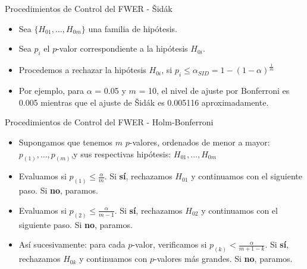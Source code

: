 \begin{frame}{Procedimientos de Control del FWER - Šidák}
\begin{itemize}[<+- | alert@+>]
    \item Sea $\{H_{01},\dots,H_{0m}\}$ una familia de hipótesis.
    \item Sea $p_i$ el $p$-valor correspondiente a la hipótesis $H_{0i}$.
    \item Procedemos a rechazar la hipótesis $H_{0i}$, si $p_i\leq\alpha _{{SID}}=1-(1-\alpha )^{{\frac  {1}{m}}}$
    \item Por ejemplo, para $\alpha$  = 0.05 y $m$ = 10, el nivel de ajuste por Bonferroni es 0.005 mientras que el ajuste de Šidák es 0.005116 aproximadamente.
\end{itemize}
\end{frame}

\begin{frame}{Procedimientos de Control del FWER - Holm-Bonferroni}
\begin{itemize}[<+- | alert@+>]
    \item Supongamos que tenemos $m$ $p$-valores, ordenados de menor a mayor: $p_{(1)}, \ldots, p_{(m)}$,y sus respectivas hipótesis: $H_{01}, \ldots, H_{0m}$
    \item Evaluamos si $p_{(1)}\leq \frac{\alpha}{m}$. Si \textbf{sí}, rechazamos $H_{01}$ y continuamos con el siguiente paso. Si \textbf{no}, paramos.
    \item Evaluamos si $p_{(2)}\leq \frac{\alpha}{m-1}$. Si \textbf{sí}, rechazamos $H_{02}$ y continuamos con el siguiente paso. Si \textbf{no}, paramos.
    \item Así sucesivamente: para cada $p$-valor, verificamos si $p_{(k)}<\frac{\alpha}{m+1-k}$.  Si \textbf{sí}, rechazamos $H_{0k}$ y continuamos con $p$-valores más grandes. Si \textbf{no}, paramos.
\end{itemize}
\end{frame}